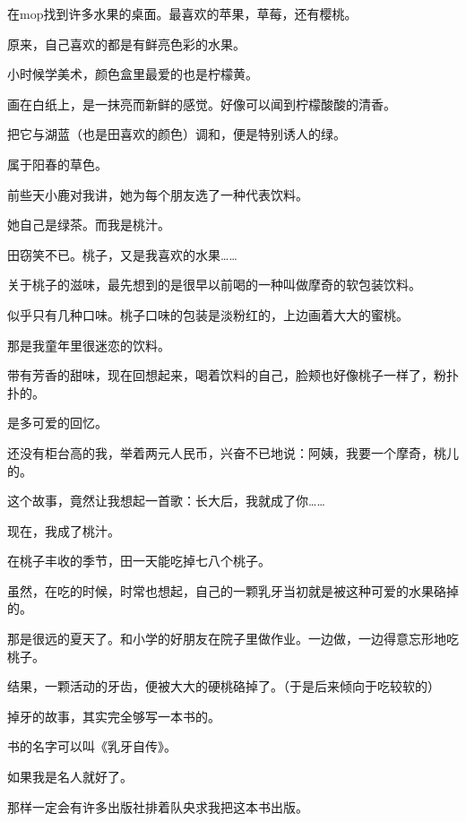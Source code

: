 \documentclass[12pt,a4paper]{article}
\def\blankrev{\vspace{1ex}}									%
\begin{document}

		在mop找到许多水果的桌面。最喜欢的苹果，草莓，还有樱桃。\par
		原来，自己喜欢的都是有鲜亮色彩的水果。\par
		小时候学美术，颜色盒里最爱的也是柠檬黄。\par
		画在白纸上，是一抹亮而新鲜的感觉。好像可以闻到柠檬酸酸的清香。\par
		把它与湖蓝（也是田喜欢的颜色）调和，便是特别诱人的绿。\par
		属于阳春的草色。

		\blankrev
		前些天小鹿对我讲，她为每个朋友选了一种代表饮料。\par
		她自己是绿茶。而我是桃汁。\par
		田窃笑不已。桃子，又是我喜欢的水果……\par
		关于桃子的滋味，最先想到的是很早以前喝的一种叫做摩奇的软包装饮料。\par
		似乎只有几种口味。桃子口味的包装是淡粉红的，上边画着大大的蜜桃。\par
		那是我童年里很迷恋的饮料。\par
		带有芳香的甜味，现在回想起来，喝着饮料的自己，脸颊也好像桃子一样了，粉扑扑的。\par
		是多可爱的回忆。\par
		还没有柜台高的我，举着两元人民币，兴奋不已地说：阿姨，我要一个摩奇，桃儿的。\par
		这个故事，竟然让我想起一首歌：长大后，我就成了你……

		\blankrev
		现在，我成了桃汁。\par
		在桃子丰收的季节，田一天能吃掉七八个桃子。\par
		虽然，在吃的时候，时常也想起，自己的一颗乳牙当初就是被这种可爱的水果硌掉的。\par
		那是很远的夏天了。和小学的好朋友在院子里做作业。一边做，一边得意忘形地吃桃子。\par
		结果，一颗活动的牙齿，便被大大的硬桃硌掉了。（于是后来倾向于吃较软的）\par
		掉牙的故事，其实完全够写一本书的。\par
		书的名字可以叫《乳牙自传》。\par
		如果我是名人就好了。\par
		那样一定会有许多出版社排着队央求我把这本书出版。

	\endwriting


\end{document}
